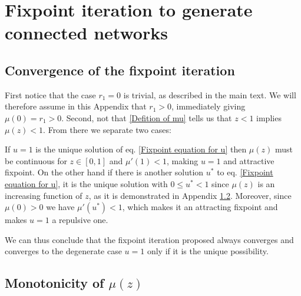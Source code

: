 \documentclass[
11pt, %
english, %
singlespacing, %
liststotoc, %
headsepline, %
]{MastersDoctoralThesis} %
\begin{document}

\appendix %

\chapter{Fixpoint iteration to generate connected networks}
\section{Convergence of the fixpoint iteration}
\label{Appendix: Fixpoint convergence}

First notice that the case $r_1 = 0$ is trivial, as described in the main text. We will therefore assume in this Appendix that $r_1 > 0$, immediately giving $\mu(0) = r_1 > 0$. Second, not that \eqref{Defition of mu} tells us that $z < 1$ implies $\mu(z) < 1$. From there we separate two cases:

If $u = 1$ is the unique solution of eq. \eqref{Fixpoint equation for u} then $\mu(z)$ must be continuous for $z \in [0, 1]$ and $\mu'(1) < 1$, making $u = 1$ and attractive fixpoint. On the other hand if there is another solution $u^*$ to eq. \eqref{Fixpoint equation for u}, it is the unique solution with $0 \leq u^* < 1$ since $\mu(z)$ is an increasing function of $z$, as it is demonstrated in Appendix \ref{Appendix: Monotonicity}. Moreover, since $\mu(0) > 0$ we have $\mu'(u^*) < 1$, which makes it an attracting fixpoint and makes $u = 1$ a repulsive one.

We can thus conclude that the fixpoint iteration proposed always converges and converges to the degenerate case $u = 1$ only if it is the unique possibility.

\section{Monotonicity of $\mu(z)$}
\label{Appendix: Monotonicity}
\end{document}

